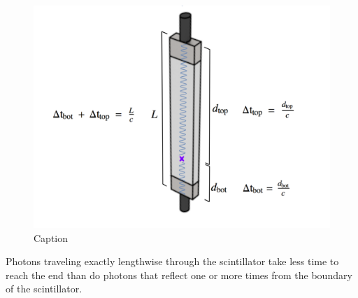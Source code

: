 \begin{figure}[h]
\includegraphics[width=\textwidth]{Content/Methods/LightPaths.png}
\caption{Caption}
\label{fig:LightPaths}
\end{figure}
Photons traveling exactly lengthwise through the scintillator take less time to reach the end than do photons that reflect one or more times from the boundary of the scintillator.

